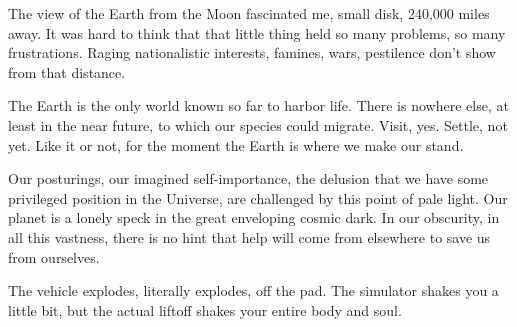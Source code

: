The view of the Earth from the Moon fascinated me, small disk, 240,000 miles away. It was hard to think that that little thing held so many problems, so many frustrations. Raging nationalistic interests, famines, wars, pestilence don't show from that distance.

The Earth is the only world known so far to harbor life. There is nowhere else, at least in the near future, to which our species could migrate. Visit, yes. Settle, not yet. Like it or not, for the moment the Earth is where we make our stand.

Our posturings, our imagined self-importance, the delusion that we have some privileged position in the Universe, are challenged by this point of pale light. Our planet is a lonely speck in the great enveloping cosmic dark. In our obscurity, in all this vastness, there is no hint that help will come from elsewhere to save us from ourselves.

The vehicle explodes, literally explodes, off the pad. The simulator shakes you a little bit, but the actual liftoff shakes your entire body and soul.




